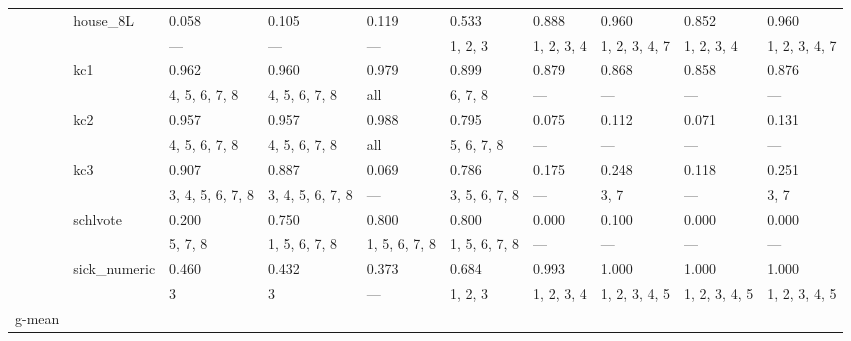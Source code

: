 \documentclass{article}
\begin{document}
\begin{center}
\begin{longtable}{p{1.2cm}p{1.8cm}p{1cm}p{1cm}p{1cm}p{1cm}p{1cm}p{1cm}p{1cm}p{1cm}}
             & house\_8L     & 0.058            & 0.105            & 0.119            & 0.533            & 0.888      & 0.960         & 0.852         & 0.960         \\
             &              & ---              & ---              & ---              & 1, 2, 3          & 1, 2, 3, 4 & 1, 2, 3, 4, 7 & 1, 2, 3, 4    & 1, 2, 3, 4, 7 \\
             & kc1          & 0.962            & 0.960            & 0.979            & 0.899            & 0.879      & 0.868         & 0.858         & 0.876         \\
             &              & 4, 5, 6, 7, 8    & 4, 5, 6, 7, 8    & all              & 6, 7, 8          & ---        & ---           & ---           & ---           \\
             & kc2          & 0.957            & 0.957            & 0.988            & 0.795            & 0.075      & 0.112         & 0.071         & 0.131         \\
             &              & 4, 5, 6, 7, 8    & 4, 5, 6, 7, 8    & all              & 5, 6, 7, 8       & ---        & ---           & ---           & ---           \\
             & kc3          & 0.907            & 0.887            & 0.069            & 0.786            & 0.175      & 0.248         & 0.118         & 0.251         \\
             &              & 3, 4, 5, 6, 7, 8 & 3, 4, 5, 6, 7, 8 & ---              & 3, 5, 6, 7, 8    & ---        & 3, 7          & ---           & 3, 7          \\
             & schlvote     & 0.200            & 0.750            & 0.800            & 0.800            & 0.000      & 0.100         & 0.000         & 0.000         \\
             &              & 5, 7, 8          & 1, 5, 6, 7, 8    & 1, 5, 6, 7, 8    & 1, 5, 6, 7, 8    & ---        & ---           & ---           & ---           \\
             & sick\_numeric & 0.460            & 0.432            & 0.373            & 0.684            & 0.993      & 1.000         & 1.000         & 1.000         \\
             &              & 3                & 3                & ---              & 1, 2, 3          & 1, 2, 3, 4 & 1, 2, 3, 4, 5 & 1, 2, 3, 4, 5 & 1, 2, 3, 4, 5 \\
 g-mean      &              &                  &                  &                  &                  &            &               &               &               \\

\end{longtable}
\end{center}
\end{document}
